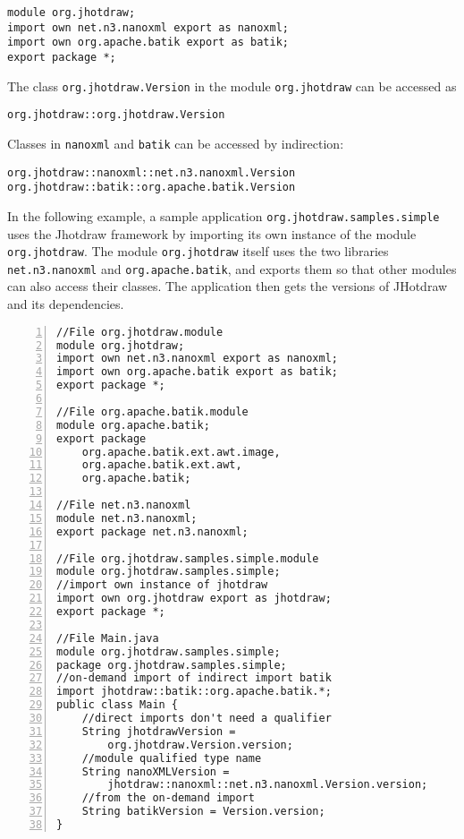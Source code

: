\begin{lstlisting}
module org.jhotdraw;
import own net.n3.nanoxml export as nanoxml;
import own org.apache.batik export as batik;
export package *;
\end{lstlisting}

The class \texttt{org.jhotdraw.Version} in the module \texttt{org.jhotdraw}
can be accessed as
\begin{lstlisting}
org.jhotdraw::org.jhotdraw.Version
\end{lstlisting}
Classes in \texttt{nanoxml} and \texttt{batik} can be accessed by indirection:
\begin{lstlisting}
org.jhotdraw::nanoxml::net.n3.nanoxml.Version
org.jhotdraw::batik::org.apache.batik.Version
\end{lstlisting}

In the following example, a sample application \texttt{org.jhotdraw.samples.simple}
uses the Jhotdraw framework by importing its own instance of the module
\texttt{org.jhotdraw}. The module \texttt{org.jhotdraw} itself uses the 
two libraries \texttt{net.n3.nanoxml} and \texttt{org.apache.batik}, and
exports them so that other modules can also access their classes. The 
application then gets the versions of JHotdraw and its dependencies.

\begin{lstlisting}[caption=Module Qualified Type References,numbers=left]
//File org.jhotdraw.module
module org.jhotdraw;
import own net.n3.nanoxml export as nanoxml;
import own org.apache.batik export as batik;
export package *;

//File org.apache.batik.module
module org.apache.batik;
export package 
	org.apache.batik.ext.awt.image,
	org.apache.batik.ext.awt,
	org.apache.batik;

//File net.n3.nanoxml
module net.n3.nanoxml;
export package net.n3.nanoxml;

//File org.jhotdraw.samples.simple.module
module org.jhotdraw.samples.simple;
//import own instance of jhotdraw
import own org.jhotdraw export as jhotdraw;
export package *;

//File Main.java
module org.jhotdraw.samples.simple;
package org.jhotdraw.samples.simple;
//on-demand import of indirect import batik
import jhotdraw::batik::org.apache.batik.*;
public class Main {
	//direct imports don't need a qualifier
	String jhotdrawVersion = 
		org.jhotdraw.Version.version;
	//module qualified type name
	String nanoXMLVersion = 
		jhotdraw::nanoxml::net.n3.nanoxml.Version.version;
	//from the on-demand import
	String batikVersion = Version.version;
}
\end{lstlisting}

